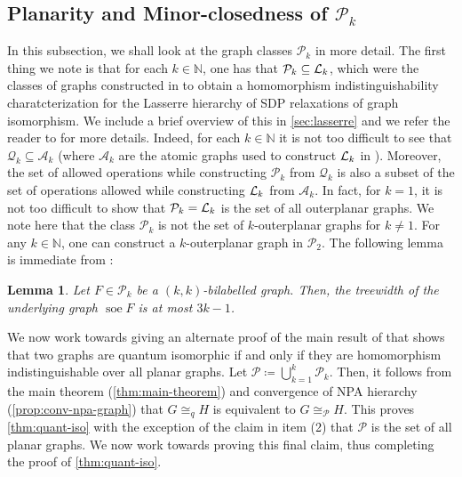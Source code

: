 \documentclass[a4paper,onecolumn,11pt,accepted=2026-01-06]{quantumarticle}
\theoremstyle{plain}
\newtheorem{lem}[thm]{Lemma}
\theoremstyle{remark}
\theoremstyle{definition}
\DeclareMathOperator{\soe}{soe}
\def\calA{{\mathcal A}} \def\calB{{\mathcal B}} \def\calC{{\mathcal C}}
\def\calP{{\mathcal P}} \def\calQ{{\mathcal Q}} \def\calR{{\mathcal R}}
\begin{document}
\subsection{Planarity and Minor-closedness of $\calP_k$}\label{sub-sec:graph-class}



In this subsection, we shall look at the graph classes $\calP_k$ in more detail. The first thing we note is that for each $k \in \mathbb{N}$, one has that $\calP_k \subseteq \calL_k$, which were the classes of graphs constructed in \cite{roberson-seppelt-arxiv} to obtain a homomorphism indistinguishability charatcterization for the Lasserre hierarchy of SDP relaxations of graph isomorphism. We include a brief overview of this in \cref{sec:lasserre} and we refer the reader to \cite{roberson-seppelt-arxiv} for more details. %
Indeed, for each $k \in \mathbb{N}$ it is not too difficult to see that $\calQ_k \subseteq \calA_k$ (where $\calA_k$ are the atomic graphs used to construct ${\mathcal L}_k$ in \cite{roberson-seppelt-arxiv}). Moreover, the set of allowed operations while constructing $\calP_k$ from $\calQ_k$ is also a subset of the set of operations allowed while constructing ${\mathcal L}_k$ from $\calA_k$. In fact, for $k = 1$, it is not too difficult to show that $\calP_k = \calL_k$ is the set of all outerplanar graphs. We note here that the class $\calP_k$ is not the set of $k$-outerplanar graphs for $k \neq 1$. For any $k \in \mathbb{N}$, one can construct a $k$-outerplanar graph in $\calP_2$. The following lemma is immediate from \cite[Lemma~4.7]{roberson-seppelt-arxiv}:

\begin{lem}\label{lem:bounded-tw}
    Let $F \in \calP_k$ be a $(k,k)$-bilabelled graph. Then, the treewidth of the underlying graph $\soe F$ is at most $3k -1$. 
\end{lem}

We now work towards giving an alternate proof of the main result of \cite{david-laura} that shows that two graphs are quantum isomorphic if and only if they are homomorphism indistinguishable over all planar graphs. %
Let $\mathcal{P} \coloneqq \bigcup_{k=1}^k \calP_k$. Then, it follows from the main theorem (\cref{thm:main-theorem}) and convergence of NPA hierarchy (\cref{prop:conv-npa-graph}) that $G \cong_q H$ is equivalent to $G \cong_{\calP} H$. This proves \cref{thm:quant-iso} with the exception of the claim in item (2) that $\calP$ is the set of all planar graphs. We now work towards proving this final claim, thus completing the proof of \cref{thm:quant-iso}.  
\end{document}
